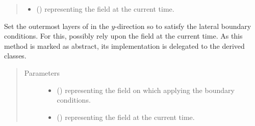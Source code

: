 \documentclass[letterpaper,10pt,english]{sphinxmanual}
\begin{document}
\begin{fulllineitems}
\begin{fulllineitems}
\begin{quote}
\begin{description}
\begin{itemize}
\item {} 
 () \textendash{}  representing the field at the current time.

\end{itemize}

\end{description}\end{quote}

\end{fulllineitems}


\begin{fulllineitems}
\label{\detokenize{api:tasmania.dycore.horizontal_boundary.HorizontalBoundary.set_outermost_layers_y}}
Set the outermost layers of  in the \(y\)-direction so to satisfy
the lateral boundary conditions. For this, possibly rely upon the field  at the current time.
As this method is marked as abstract, its implementation is delegated to the derived classes.
\begin{quote}\begin{description}
\item[{Parameters}] \leavevmode\begin{itemize}
\item {} 
 () \textendash{}  representing the field on which applying the boundary conditions.

\item {} 
 () \textendash{}  representing the field at the current time.

\end{itemize}

\end{description}\end{quote}

\end{fulllineitems}


\end{fulllineitems}
\end{document}
